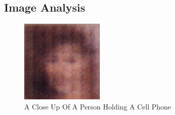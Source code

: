 \documentclass{article}%
\begin{document}
%
\subsection{Image Analysis}%
\label{subsec:ImageAnalysis}%


\begin{figure}[h!]%
\centering%
\includegraphics[width=150px]{500_fake_images/samples_5_221.png}%
\caption{A Close Up Of A Person Holding A Cell Phone}%
\end{figure}

%
\end{document}
